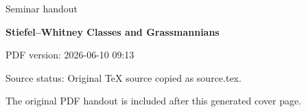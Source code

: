 \documentclass[11pt,a4paper]{article}
\newcommand{\seminartitle}{Stiefel--Whitney Classes and Grassmannians}
\newcommand{\seminarsubtitle}{Seminar handout}
\newcommand{\seminardate}{2026-06-10 09:13}
\newcommand{\seminarsourcestatus}{Original TeX source copied as source.tex.}
\begin{document}
\begin{titlepage}
\thispagestyle{empty}
\vspace*{0.16\textheight}
{\Large\color{seminarblue}\seminarsubtitle\par}
\vspace{1.5em}
{\LARGE\bfseries \seminartitle\par}
\vspace{2em}
{\large PDF version: \seminardate\par}
\vfill
{\small Source status: \seminarsourcestatus\par}
\vspace{1em}
{\small The original PDF handout is included after this generated cover page.\par}
\end{titlepage}

\clearpage
\hypersetup{pageanchor=false}

\end{document}
